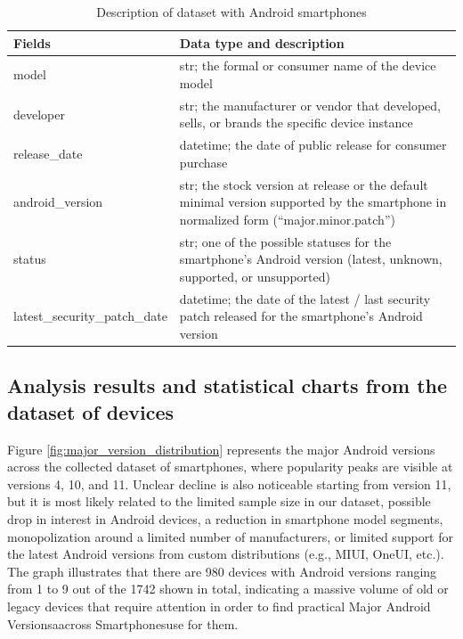 \begin{table}[htbp]
    \centering
    \begin{tabular}{|l|p{10cm}|}
        \hline
        \textbf{Fields} & \textbf{Data type and description} \\
        \hline
        model & str; the formal or consumer name of the device model \\
        \hline
        developer & str; the manufacturer or vendor that developed, sells, or brands the specific device instance \\
        \hline
        release\_date & datetime; the date of public release for consumer purchase \\
        \hline
        android\_version & str; the stock version at release or the default minimal version supported by the smartphone in normalized form (``major.minor.patch'') \\
        \hline
        status & str; one of the possible statuses for the smartphone's Android version (latest, unknown, supported, or unsupported) \\
        \hline
        latest\_security\_patch\_date & datetime; the date of the latest / last security patch released for the smartphone's Android version \\
        \hline
    \end{tabular}
    \caption{Description of dataset with Android smartphones}
    \label{tab:android_dataset_description}
\end{table}

\subsection{Analysis results and statistical charts from the dataset of devices}

Figure \ref{fig:major_version_distribution} represents the major Android versions across the collected dataset of smartphones, where popularity peaks are visible at versions 4, 10, and 11. Unclear decline is also noticeable starting from version 11, but it is most likely related to the limited sample size in our dataset, possible drop in  interest in Android devices, a reduction in smartphone model segments, monopolization around a limited number of manufacturers, or limited support for the latest Android versions from custom distributions (e.g., MIUI, OneUI, etc.). The graph illustrates that there are 980 devices with Android versions ranging from 1 to 9 out of the 1742 shown in total, indicating a massive volume of old or legacy devices that require attention in order to find practical Major Android Versionsaacross Smartphonesuse for them.

